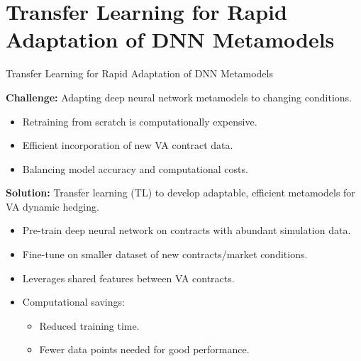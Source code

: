 \documentclass[9pt,handout]{beamer}
\begin{document}
\section{Transfer Learning for Rapid Adaptation of DNN Metamodels}
\begin{frame}{Transfer Learning for Rapid Adaptation of DNN Metamodels}

    \textbf{Challenge:} Adapting deep neural network metamodels to changing conditions.
    \begin{itemize}
        \item   Retraining from scratch is computationally expensive.
        \item   Efficient incorporation of new VA contract data.
        \item   Balancing model accuracy and computational costs.
    \end{itemize}

    \vspace{10pt}

    \textbf{Solution:} Transfer learning (TL) to develop adaptable, efficient metamodels for VA dynamic hedging.

    \begin{itemize}
        \item   Pre-train deep neural network on contracts with abundant simulation data.
        \item   Fine-tune on smaller dataset of new contracts/market conditions.
        \item   Leverages shared features between VA contracts.
        \item   Computational savings:
            \begin{itemize}
                \item   Reduced training time.
                \item   Fewer data points needed for good performance.
            \end{itemize}
    \end{itemize}

\end{frame}
\end{document}
